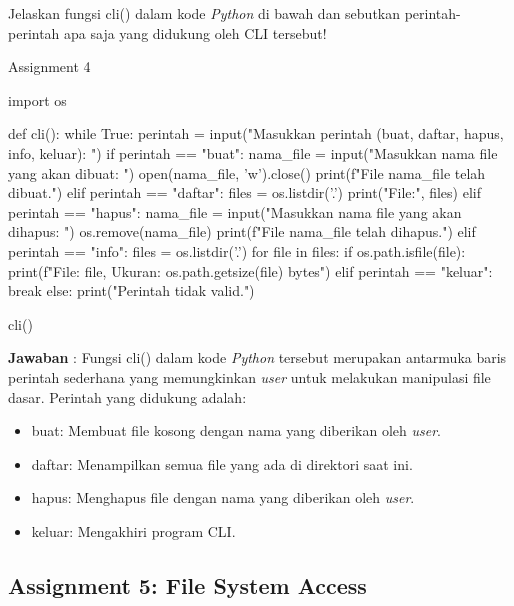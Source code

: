 \documentclass[12pt]{article}
\begin{document}
\vspace{0.2cm}

Jelaskan fungsi cli() dalam kode \textit{Python} di bawah dan sebutkan perintah-perintah apa saja yang didukung oleh CLI tersebut!

\begin{python}
Assignment 4

import os

def cli():
    while True:
        perintah = input("Masukkan perintah (buat, daftar, hapus, info, keluar): ")
        if perintah == "buat":
            nama_file = input("Masukkan nama file yang akan dibuat: ")
            open(nama_file, 'w').close()
            print(f"File {nama_file} telah dibuat.")
        elif perintah == "daftar":
            files = os.listdir('.')
            print("File:", files)
        elif perintah == "hapus":
            nama_file = input("Masukkan nama file yang akan dihapus: ")
            os.remove(nama_file)
            print(f"File {nama_file} telah dihapus.")
        elif perintah == "info":
            files = os.listdir('.')
            for file in files:
                if os.path.isfile(file):
                    print(f"File: {file}, Ukuran: {os.path.getsize(file)} bytes")
        elif perintah == "keluar":
            break
        else:
            print("Perintah tidak valid.")

cli()

\end{python}

\textbf{Jawaban} : Fungsi cli() dalam kode \textit{Python} tersebut merupakan antarmuka baris perintah sederhana yang memungkinkan \textit{user} untuk melakukan manipulasi file dasar. Perintah yang didukung adalah:

\begin{itemize}
    \item buat: Membuat file kosong dengan nama yang diberikan oleh \textit{user}.
    \item daftar: Menampilkan semua file yang ada di direktori saat ini.
    \item hapus: Menghapus file dengan nama yang diberikan oleh \textit{user}.
    \item keluar: Mengakhiri program CLI.
\end{itemize}


\subsection{Assignment 5: File System Access}
\end{document}
